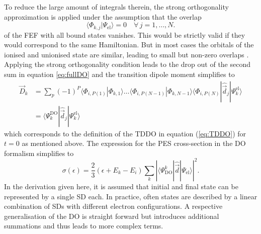 To reduce the large amount of integrals therein, the strong orthogonality approximation is applied under the assumption that the overlap 
\begin{equation}
 \langle \Phi_{k,j}  |\Psi_\text{el}\rangle=0 \quad \forall\, j=1,\hdots, N.
\end{equation}
of the FEF with all bound states vanishes.
This would be strictly valid if they would correspond to the same Hamiltonian.
But in most cases the orbitals of the ionised and unionised state are similar, leading to small but non-zero overlaps \cite{saPonzi,GrellKuehn}.
Applying the strong orthogonality condition leads to the drop out of the second sum in equation \ref{eq:fullDO} and the transition dipole moment simplifies to
\begin{align} \label{eq:sigma_do}
\vec{D}_k&= \sum_p (-1)^P \langle \Phi_{i,P(1)}  |\Phi_{k,1} \rangle
            \hdots  \langle \Phi_{i,P(N-1)}|\Phi_{k,N-1} \rangle
                   \langle \Phi_{i,P(N)} |\hat{\vec{d}}_j |\Psi_k^\text{el}\rangle \nonumber \\
    &= \langle \Psi_k^\text{DO}| \hat{\vec{d}}_j| \Psi_k^\text{el}\rangle
\end{align}
which corresponds to the definition of the TDDO in equation (\ref{eq:TDDO}) for $t=0$ as mentioned above.
The expression for the PES cross-section in the DO formalism simplifies to
\begin{equation} \label{eq:DO_pes}
\sigma(\epsilon) =\frac 23 (\epsilon +E_k-E_i)
           \sum_k \left|  \langle \Psi^k_\text{DO} | \hat{\vec{d}} | \Psi_\text{el}\rangle  \right|^2 .
\end{equation}
In the derivation given here, it is assumed that initial and final state can be represented by a single SD each.
In practice, often states are described by a linear combination of SDs with different electron configurations.
A respective generalisation of the DO is straight forward but introduces additional summations and thus leads to more complex terms.

